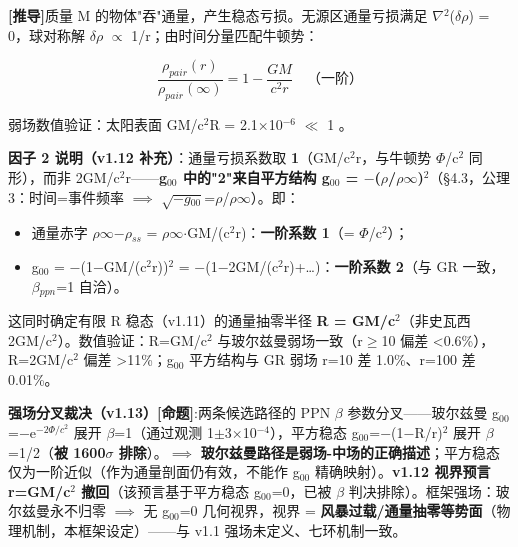 \documentclass[12pt]{article}
\newcommand{\mtag}[1]{\textbf{[#1]}}
\newcommand{\up}[1]{\ensuremath{^{#1}}}
\newcommand{\down}[1]{\ensuremath{_{#1}}}
\begin{document}
\mtag{推导}质量 M 的物体"吞"通量，产生稳态亏损。无源区通量亏损满足 \ensuremath{\nabla}\up{2}(\ensuremath{\delta}\ensuremath{\rho}) = 0，球对称解 \ensuremath{\delta}\ensuremath{\rho} \ensuremath{\propto} 1/r；由时间分量匹配牛顿势：

\[\frac{\rho_{pair}(r)}{\rho_{pair}(\infty)} = 1 - \frac{GM}{c^2 r} \quad\text{（一阶）}\]

弱场数值验证：太阳表面 GM/c\up{2}R = 2.1\ensuremath{\times}10\up{-6} \ensuremath{\ll} 1 \checkmark。

\textbf{因子 2 说明（v1.12 补充）}：通量亏损系数取 \textbf{1}（GM/c\up{2}r，与牛顿势 \ensuremath{\Phi}/c\up{2} 同形），而非 2GM/c\up{2}r------\textbf{g\down{00} 中的"2"来自平方结构 g\down{00} = \ensuremath{-}(\ensuremath{\rho}/\ensuremath{\rho}\ensuremath{\infty})\up{2}}（\S{}4.3，公理 3：时间=事件频率 \ensuremath{\implies} \ensuremath{\sqrt{-g\down{00}}}=\ensuremath{\rho}/\ensuremath{\rho}\ensuremath{\infty}）。即：
\begin{itemize}
\item 通量赤字 \ensuremath{\rho}\ensuremath{\infty}\ensuremath{-}\ensuremath{\rho}\down{ss} = \ensuremath{\rho}\ensuremath{\infty}\ensuremath{\cdot}GM/(c\up{2}r)：\textbf{一阶系数 1}（= \ensuremath{\Phi}/c\up{2}）；
\item g\down{00} = \ensuremath{-}(1\ensuremath{-}GM/(c\up{2}r))\up{2} = \ensuremath{-}(1\ensuremath{-}2GM/(c\up{2}r)+\ldots{})：\textbf{一阶系数 2}（与 GR 一致，\ensuremath{\beta}\down{ppn}=1 自洽）。
\end{itemize}
这同时确定有限 R 稳态（v1.11）的通量抽零半径 \textbf{R = GM/c\up{2}}（非史瓦西 2GM/c\up{2}）。数值验证：R=GM/c\up{2} 与玻尔兹曼弱场一致（r\ensuremath{\geq}10 偏差 <0.6\%），R=2GM/c\up{2} 偏差 >11\%；g\down{00} 平方结构与 GR 弱场 r=10 差 1.0\%、r=100 差 0.01\%。

\textbf{强场分叉裁决（v1.13）}\mtag{命题}:两条候选路径的 PPN \ensuremath{\beta} 参数分叉------玻尔兹曼 g\down{00}=\ensuremath{-}e\up{-2\Phi{}/c^{2}} 展开 \ensuremath{\beta}=1（通过观测 1\ensuremath{\pm}3\ensuremath{\times}10\up{-4}），平方稳态 g\down{00}=\ensuremath{-}(1\ensuremath{-}R/r)\up{2} 展开 \ensuremath{\beta}=1/2（\textbf{被 1600\ensuremath{\sigma} 排除}）。\ensuremath{\implies} \textbf{玻尔兹曼路径是弱场-中场的正确描述}；平方稳态仅为一阶近似（作为通量剖面仍有效，不能作 g\down{00} 精确映射）。\textbf{v1.12 视界预言 r=GM/c\up{2} 撤回}（该预言基于平方稳态 g\down{00}=0，已被 \ensuremath{\beta} 判决排除）。框架强场：玻尔兹曼永不归零 \ensuremath{\implies} 无 g\down{00}=0 几何视界，视界 = \textbf{风暴过载/通量抽零等势面}（物理机制，本框架设定）------与 v1.1 强场未定义、七环机制一致。
\end{document}
